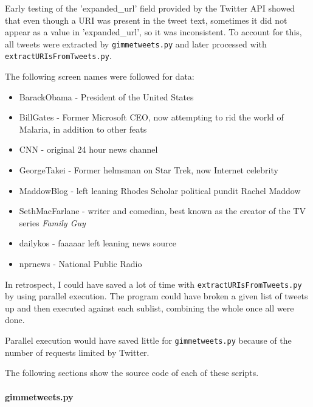 \documentclass[letterpaper,11pt]{article}
\begin{document}
Early testing of the 'expanded\_url' field provided by the Twitter API showed that even though a URI was present in the tweet text, sometimes it did not appear as a value in 'expanded\_url', so it was inconsistent.  To account for this, all tweets were extracted by \verb+gimmetweets.py+ and later processed with \verb+extractURIsFromTweets.py+.

The following screen names were followed for data:
\begin{itemize}
\item BarackObama - President of the United States
\item BillGates - Former Microsoft CEO, now attempting to rid the world of Malaria, in addition to other feats
\item CNN - original 24 hour news channel
\item GeorgeTakei - Former helmsman on Star Trek, now Internet celebrity
\item MaddowBlog - left leaning Rhodes Scholar political pundit Rachel Maddow
\item SethMacFarlane - writer and comedian, best known as the creator of the TV series \emph{Family Guy}
\item dailykos - faaaaar left leaning news source
\item nprnews - National Public Radio
\end{itemize}

In retrospect, I could have saved a lot of time with \verb+extractURIsFromTweets.py+ by using parallel execution.  The program could have broken a given list of tweets up and then executed against each sublist, combining the whole once all were done.

Parallel execution would have saved little for \verb+gimmetweets.py+ because of the number of requests limited by Twitter.

The following sections show the source code of each of these scripts.

\newpage
\paragraph{gimmetweets.py}\mbox{} \\


\end{document}
